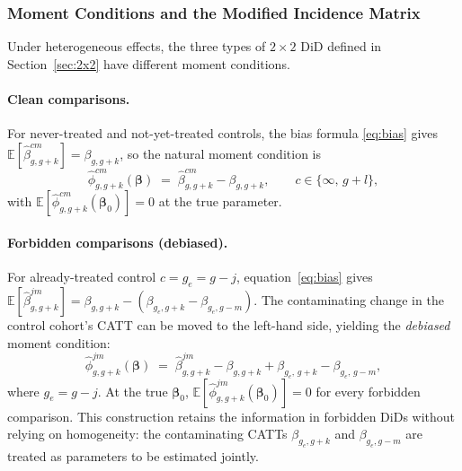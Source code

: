 \documentclass[12pt,letterpaper]{article}
\theoremstyle{remark}
\theoremstyle{definition}
\newcommand{\E}{\mathbb{E}}
\newcommand{\hbeta}{\hat{\beta}}
\begin{document}
\subsubsection{Moment Conditions and the Modified Incidence Matrix}
\label{sec:gmm_hetero_moments}

Under heterogeneous effects, the three types of $2\times2$ DiD defined in
Section~\ref{sec:2x2} have different moment conditions.

\paragraph{Clean comparisons.}
For never-treated and not-yet-treated controls, the bias formula
\eqref{eq:bias} gives $\E[\hbeta^{cm}_{g,g+k}]=\beta_{g,g+k}$, so the
natural moment condition is
\begin{equation}
  \hat{\phi}^{cm}_{g,g+k}(\boldsymbol{\beta})
  \;=\;
  \hbeta^{cm}_{g,g+k} - \beta_{g,g+k},
  \qquad c\in\{\infty,\,g+l\},
  \label{eq:moment_clean_h}
\end{equation}
with $\E[\hat{\phi}^{cm}_{g,g+k}(\boldsymbol{\beta}_0)]=0$ at the true
parameter.

\paragraph{Forbidden comparisons (debiased).}
For already-treated control $c=g_e=g-j$, equation~\eqref{eq:bias} gives
$\E[\hbeta^{jm}_{g,g+k}]=\beta_{g,g+k}-(\beta_{g_e,g+k}-\beta_{g_e,g-m})$.
The contaminating change in the control cohort's CATT can be moved to the
left-hand side, yielding the \emph{debiased} moment condition:
\begin{equation}
  \hat{\phi}^{jm}_{g,g+k}(\boldsymbol{\beta})
  \;=\;
  \hbeta^{jm}_{g,g+k} - \beta_{g,g+k}
  + \beta_{g_e,\,g+k} - \beta_{g_e,\,g-m},
  \label{eq:moment_forb_h}
\end{equation}
where $g_e=g-j$. At the true $\boldsymbol{\beta}_0$,
$\E[\hat{\phi}^{jm}_{g,g+k}(\boldsymbol{\beta}_0)]=0$ for every forbidden
comparison. This construction retains the information in forbidden DiDs
without relying on homogeneity: the contaminating CATTs
$\beta_{g_e,g+k}$ and $\beta_{g_e,g-m}$ are treated as parameters to be
estimated jointly.
\end{document}
